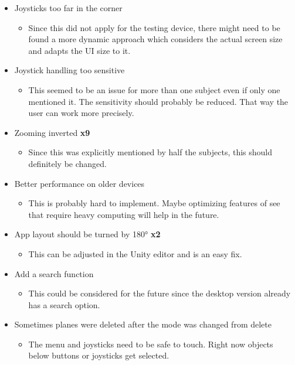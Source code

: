 \begin{itemize}
\begin{itemize}
  \end{itemize}
  \item Joysticks too far in the corner
  \begin{itemize}
    \item Since this did not apply for the testing device, there might need to be found a more dynamic approach which considers the actual screen size and adapts the UI size to it. 
  \end{itemize}
  \item Joystick handling too sensitive 
  \begin{itemize}
    \item This seemed to be an issue for more than one subject even if only one mentioned it. The sensitivity should probably be reduced. That way the user can work more precisely.
  \end{itemize}
  \item Zooming inverted \textbf{x9}
  \begin{itemize}
    \item Since this was explicitly mentioned by half the subjects, this should definitely be changed. 
  \end{itemize}
  \item Better performance on older devices
  \begin{itemize}
    \item This is probably hard to implement. Maybe optimizing features of \gls{see} that require heavy computing will help in the future.
  \end{itemize}
  \item App layout should be turned by 180° \textbf{x2}
  \begin{itemize}
    \item This can be adjusted in the Unity editor and is an easy fix. 
  \end{itemize}
  \item Add a search function
  \begin{itemize}
    \item This could be considered for the future since the desktop version already has a search option.
  \end{itemize}
  \item Sometimes \glspl{plane} were deleted after the mode was changed from delete
  \begin{itemize}
    \item The menu and joysticks need to be safe to touch. Right now objects below buttons or joysticks get selected.
  \end{itemize}
\end{itemize} 

